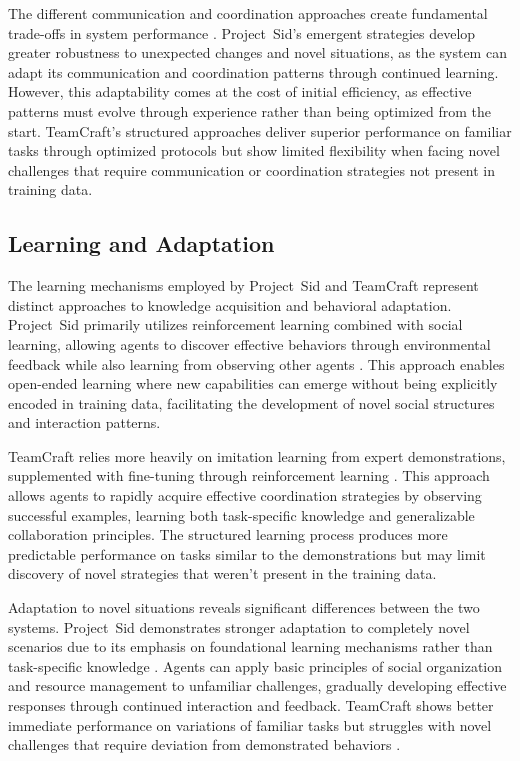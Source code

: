 \documentclass[a4paper, 12pt]{article}
\begin{document}
The different communication and coordination approaches create fundamental trade-offs in system performance \autocite{Altera2024, Long2024, Qiu2024, Dong2024}. Project~Sid's emergent strategies develop greater robustness to unexpected changes and novel situations, as the system can adapt its communication and coordination patterns through continued learning. However, this adaptability comes at the cost of initial efficiency, as effective patterns must evolve through experience rather than being optimized from the start. TeamCraft's structured approaches deliver superior performance on familiar tasks through optimized protocols but show limited flexibility when facing novel challenges that require communication or coordination strategies not present in training data.

\subsection{Learning and Adaptation}

The learning mechanisms employed by Project~Sid and TeamCraft represent distinct approaches to knowledge acquisition and behavioral adaptation. Project~Sid primarily utilizes reinforcement learning combined with social learning, allowing \linebreak agents to discover effective behaviors through environmental feedback while also learning from observing other agents \autocite{Altera2024}. This approach enables open-ended learning where new capabilities can emerge without being explicitly encoded in training data, facilitating the development of novel social structures and interaction patterns.

TeamCraft relies more heavily on imitation learning from expert demonstrations, supplemented with fine-tuning through reinforcement learning \autocite{Long2024, Zhao2024}. This approach allows agents to rapidly acquire effective coordination strategies by observing successful examples, learning both task-specific knowledge and generalizable collaboration principles. The structured learning process produces more predictable performance on tasks similar to the demonstrations but may limit discovery of novel strategies that weren't present in the training data.

Adaptation to novel situations reveals significant differences between the two systems. Project~Sid demonstrates stronger adaptation to completely novel scenarios due to its emphasis on foundational learning mechanisms rather than task-specific knowledge \autocite{Altera2024}. Agents can apply basic principles of social organization and resource management to unfamiliar challenges, gradually developing effective responses through continued interaction and feedback. TeamCraft shows better immediate performance on variations of familiar tasks but struggles with novel challenges that require deviation from demonstrated behaviors \autocite{Long2024}.
\end{document}
